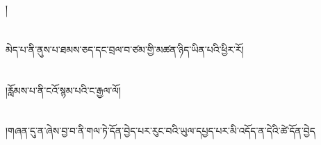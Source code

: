 །\chapter{ }མེད་པ་ནི་ནུས་པ་ཐམས་ཅད་དང་བྲལ་བ་ཙམ་གྱི་མཚན་ཉིད་ཡིན་པའི་ཕྱིར་རོ།\chapter{ }།རློམས་པ་ནི་ངའོ་སྙམ་པའི་ང་རྒྱལ་ལོ།\chapter{ }།གཞན་དུ་ན་ཞེས་བྱ་བ་ནི་གལ་ཏེ་དོན་བྱེད་པར་རུང་བའི་ཡུལ་དཔྱད་པར་མི་འདོད་ན་དེའི་ཚེ་དོན་བྱེད